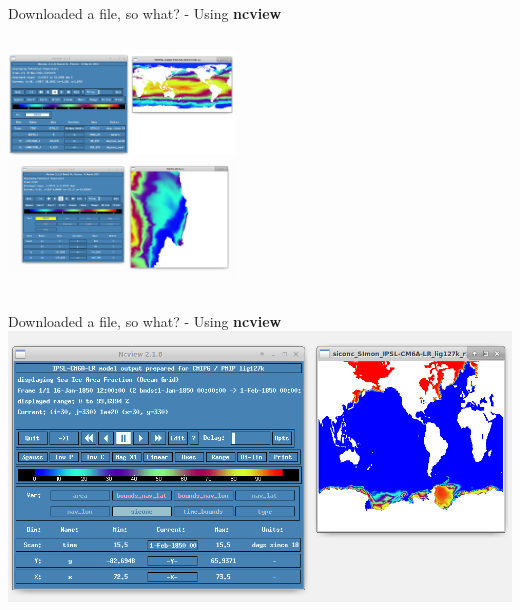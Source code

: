 \begin{frame}{\insertsectionnumber{ |} Downloaded a file, so what? - Using \textbf{ncview}}
    \begin{columns}
        \column[c]{6.5cm}
            \centering\includegraphics[width=6cm]{images/Theta.png} \\
        \column[c]{6.5cm}
            \centering\includegraphics[width=6cm]{images/MIT_eccoV5.png} \\
    \end{columns}
\end{frame}


\begin{frame}{\insertsectionnumber{ |} Downloaded a file, so what? - Using \textbf{ncview}}
    \flushleft\includegraphics[scale=0.33]{images/tripolar.png}\hspace*{1cm}\\
\end{frame}


